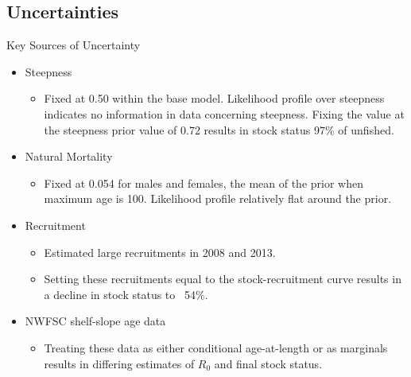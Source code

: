\documentclass[pdf]{beamer}\usepackage[]{graphicx}\usepackage[]{color}
\begin{document}

\subsection{Uncertainties}
\begin{frame}{Key Sources of Uncertainty}
  \begin{itemize}
    \item Steepness
    \begin{itemize}
      \item Fixed at 0.50 within the base model.  Likelihood profile over steepness indicates no information in data concerning steepness.  Fixing the value at the steepness prior value of 0.72 results in stock status 97\% of unfished.
    \end{itemize}
    \item Natural Mortality
      \begin{itemize}
        \item Fixed at 0.054 for males and females, the mean of the prior when maximum age is 100.  Likelihood profile relatively flat around the prior.
      \end{itemize}
    \item Recruitment 
      \begin{itemize} 
        \item Estimated large recruitments in 2008 and 2013. 
        \item Setting these recruitments equal to the stock-recruitment curve results in a decline in stock status to ~54\%.
      \end{itemize}
    \item{NWFSC shelf-slope age data}
      \begin{itemize}
        \item Treating these data as either conditional age-at-length or as marginals results in differing estimates of $R_0$ and final stock status.
      \end{itemize}
  \end{itemize}
\end{frame}



\end{document}
